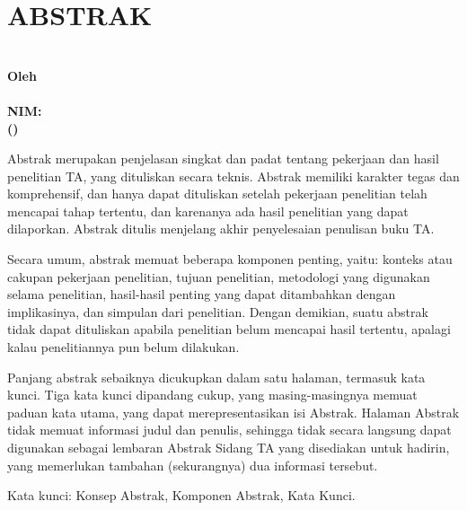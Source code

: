 \chapter{ABSTRAK}
\label{chp:abstrak}
\vspace{\baselineskip}
\begin{center}
  \bfseries\large
  \MakeUppercase{\titlename} \\
  \vspace{1\baselineskip}
  \normalsize\normalfont Oleh \\
  \bfseries\large \authorname \\
  NIM: \authorid \\
  (\department) \\
\end{center}

\vspace{2\baselineskip} \noindent
Abstrak merupakan penjelasan singkat dan padat tentang pekerjaan dan hasil penelitian TA, yang dituliskan secara teknis. Abstrak memiliki karakter tegas dan komprehensif, dan hanya dapat dituliskan setelah pekerjaan penelitian telah mencapai tahap tertentu, dan karenanya ada hasil penelitian yang dapat dilaporkan. Abstrak ditulis menjelang akhir penyelesaian penulisan buku TA.
\vspace{\baselineskip}

\noindent
Secara umum, abstrak memuat beberapa komponen penting, yaitu: konteks atau cakupan pekerjaan penelitian, tujuan penelitian, metodologi yang digunakan selama penelitian, hasil-hasil penting yang dapat ditambahkan dengan implikasinya, dan simpulan dari penelitian. Dengan demikian, suatu abstrak tidak dapat dituliskan apabila penelitian belum mencapai hasil tertentu, apalagi kalau penelitiannya pun belum dilakukan.
\vspace{\baselineskip}

\noindent
Panjang abstrak sebaiknya dicukupkan dalam satu halaman, termasuk kata kunci. Tiga kata kunci dipandang cukup, yang masing-masingnya memuat paduan kata utama, yang dapat merepresentasikan isi Abstrak. Halaman Abstrak tidak memuat informasi judul dan penulis, sehingga tidak secara langsung dapat digunakan sebagai lembaran Abstrak Sidang TA yang disediakan untuk hadirin, yang memerlukan tambahan (sekurangnya) dua informasi tersebut.

\begin{flushleft}
  Kata kunci: Konsep Abstrak, Komponen Abstrak, Kata Kunci.
\end{flushleft}